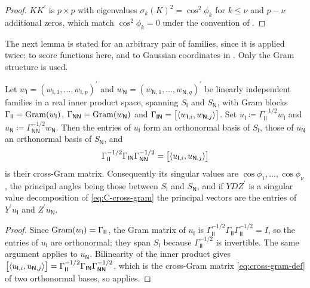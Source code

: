 \documentclass{IEEEtran}
\begin{document}
\begin{proof}
  $KK^{\prime}$ is $p \times p$ with eigenvalues $\sigma_{k}(K)^{2} = \cos^{2}\phi_{k}$ for $k \le \nu$ and $p - \nu$ additional zeros, which match $\cos^{2}\phi_{k} = 0$ under the convention of .
\end{proof}

The next lemma is stated for an arbitrary pair of families, since it is applied twice: to score functions here, and to Gaussian coordinates in . Only the Gram structure is used.

\begin{lemma}
  \label{lem:whitened-angles}
  Let $w_{\mathsf{I}} = (w_{\mathsf{I},1},\ldots,w_{\mathsf{I},p})^{\prime}$ and $w_{\mathsf{N}} = (w_{\mathsf{N},1},\ldots,w_{\mathsf{N},q})^{\prime}$ be linearly independent families in a real inner product space, spanning $S_{\mathsf{I}}$ and $S_{\mathsf{N}}$, with Gram blocks $\Gamma_{\mathsf{II}} = \gram(w_{\mathsf{I}})$, $\Gamma_{\mathsf{NN}} = \gram(w_{\mathsf{N}})$ and $\Gamma_{\mathsf{IN}} = \bigl[\inner{w_{\mathsf{I},i},w_{\mathsf{N},j}}\bigr]$. Set $u_{\mathsf{I}} \coloneq \Gamma_{\mathsf{II}}^{-1/2}w_{\mathsf{I}}$ and $u_{\mathsf{N}} \coloneq \Gamma_{\mathsf{NN}}^{-1/2}w_{\mathsf{N}}$. Then the entries of $u_{\mathsf{I}}$ form an orthonormal basis of $S_{\mathsf{I}}$, those of $u_{\mathsf{N}}$ an orthonormal basis of $S_{\mathsf{N}}$, and
  \begin{equation}
    \Gamma_{\mathsf{II}}^{-1/2}\Gamma_{\mathsf{IN}}\Gamma_{\mathsf{NN}}^{-1/2}
    = \bigl[\inner{u_{\mathsf{I},i}, u_{\mathsf{N},j}}\bigr]
    \label{eq:C-cross-gram}
  \end{equation}
  is their cross-Gram matrix. Consequently its singular values are $\cos\phi_{1},\ldots,\cos\phi_{\nu}$, the principal angles being those between $S_{\mathsf{I}}$ and $S_{\mathsf{N}}$, and if $Y D Z^{\prime}$ is a singular value decomposition of \eqref{eq:C-cross-gram} the principal vectors are the entries of $Y^{\prime}u_{\mathsf{I}}$ and $Z^{\prime}u_{\mathsf{N}}$.
\end{lemma}

\begin{proof}
  Since $\gram(w_{\mathsf{I}}) = \Gamma_{\mathsf{II}}$, the Gram matrix of $u_{\mathsf{I}}$ is $\Gamma_{\mathsf{II}}^{-1/2}\Gamma_{\mathsf{II}}\Gamma_{\mathsf{II}}^{-1/2} = I$, so the entries of $u_{\mathsf{I}}$ are orthonormal; they span $S_{\mathsf{I}}$ because $\Gamma_{\mathsf{II}}^{-1/2}$ is invertible. The same argument applies to $u_{\mathsf{N}}$. Bilinearity of the inner product gives $\bigl[\inner{u_{\mathsf{I},i},u_{\mathsf{N},j}}\bigr] = \Gamma_{\mathsf{II}}^{-1/2}\Gamma_{\mathsf{IN}}\Gamma_{\mathsf{NN}}^{-1/2}$, which is the cross-Gram matrix \eqref{eq:cross-gram-def} of two orthonormal bases, so  applies.
\end{proof}
\end{document}
